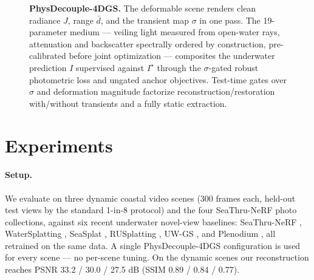 \documentclass[11pt,a4paper]{article}
\newcommand{\Binf}{B_\infty}
\newcommand{\J}{J}
\newcommand{\I}{I}
\newcommand{\Lcal}{\mathcal{L}}
\begin{document}
\begin{figure}[htbp]
{
}
\caption{\textbf{PhysDecouple-4DGS.} The deformable scene renders clean radiance $\J$, range $\bar d$, and the transient map $\sigma$ in one pass. The 19-parameter medium --- veiling light measured from open-water rays, attenuation and backscatter spectrally ordered by construction, pre-calibrated before joint optimization --- composites the underwater prediction $\I$ supervised against $\I^\star$ through the $\sigma$-gated robust photometric loss and ungated anchor objectives. Test-time gates over $\sigma$ and deformation magnitude factorize reconstruction/restoration with/without transients and a fully static extraction.}
\label{fig:architecture}
\end{figure}

\section{Experiments}

\paragraph{Setup.} We evaluate on three dynamic coastal video scenes (300 frames each, held-out test views by the standard 1-in-8 protocol) and the four SeaThru-NeRF photo collections, against six recent underwater novel-view baselines: SeaThru-NeRF \cite{levy2023seathru}, WaterSplatting \cite{li2025watersplatting}, SeaSplat \cite{yang2025seasplat}, RUSplatting \cite{jiang2025rusplatting}, UW-GS \cite{wang2025uwgs}, and Plenodium \cite{wu2025plenodium}, all retrained on the same data. A single PhysDecouple-4DGS configuration is used for every scene --- no per-scene tuning. On the dynamic scenes our reconstruction reaches PSNR 33.2 / 30.0 / 27.5 dB (SSIM 0.89 / 0.84 / 0.77).
\end{document}
